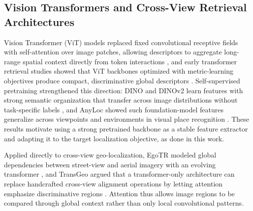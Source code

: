 \documentclass[conference]{IEEEtran}
\begin{document}
\subsection{Vision Transformers and Cross-View Retrieval Architectures}
Vision Transformer (ViT) models replaced fixed convolutional receptive fields
with self-attention over image patches, allowing descriptors to aggregate
long-range spatial context directly from token interactions
\cite{dosovitskiy2021vit}, and early transformer retrieval studies showed
that ViT backbones optimized with metric-learning objectives produce compact,
discriminative global descriptors \cite{el2021vitretrieval}.
Self-supervised pretraining strengthened this direction: DINO and DINOv2
learn features with strong semantic organization that transfer across image
distributions without task-specific labels
\cite{caron2021dino,oquab2023dinov2}, and AnyLoc showed such
foundation-model features generalize across viewpoints and environments in
visual place recognition \cite{keetha2023anyloc}. These results motivate
using a strong pretrained backbone as a stable feature extractor and
adapting it to the target localization objective, as done in this work.

Applied directly to cross-view geo-localization, EgoTR modeled global
dependencies between street-view and aerial imagery with an evolving
transformer \cite{zhu2021egotr}, and TransGeo argued that a
transformer-only architecture can replace handcrafted cross-view alignment
operations by letting attention emphasize discriminative regions
\cite{zhu2022transgeo}. Attention thus allows image regions to be compared
through global context rather than only local convolutional patterns.
\end{document}
